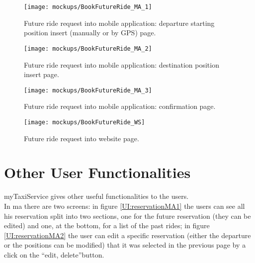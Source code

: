 \documentclass[\mainpath/main]{subfiles}
\begin{document}
\begin{figure}[ht!]
	\centering
	\begin{minipage}[t]{0.4\textwidth}
		\centering
		\texttt{[image: mockups/BookFutureRide\_MA\_1]}
		\caption[Future ride request part1 into mobile application.]{Future ride request into mobile application: departure starting position insert (manually or by GPS) page.}
		\label{UI:futuretimeMA1}
	\end{minipage}
	\hspace{1 cm}
	\begin{minipage}[t]{0.40\linewidth}
		\centering
		\texttt{[image: mockups/BookFutureRide\_MA\_2]}
		\caption[Future ride request part2 into mobile application.]{Future ride request into mobile application: destination position insert page.}
		\label{UI:futuretimeMA2}
	\end{minipage}
\end{figure}

\begin{figure}[ht!]
	\centering
	\begin{minipage}[t]{0.4\textwidth}
		\centering
		\texttt{[image: mockups/BookFutureRide\_MA\_3]}
		\caption[Future ride request part3 into mobile application.]{Future ride request into mobile application: confirmation page.}
		\label{UI:futuretimeMA3}
	\end{minipage}
	\hspace{1 cm}
	\begin{minipage}[t]{0.40\linewidth}
		\centering
		\texttt{[image: mockups/BookFutureRide\_WS]}
		\caption[Future ride request into website.]{Future ride request into website page.}
		\label{UI:futuretimeWS}
	\end{minipage}
\end{figure}

\section{Other User Functionalities}
\label{UI:OtherUserFunctionalities}
myTaxiService gives other useful functionalities to the users.\\
In \gls{ma} there are two screens: in figure \ref{UI:reservationMA1} the users can see all his reservation split into two sections, one for the future reservation (they can be edited) and one, at the bottom, for a list of the past rides; in figure \ref{UI:reservationMA2} the user can edit a specific reservation (either the departure or the positions can be modified) that it was selected in the previous page by a click on the \textquotedblleft edit, delete\textquotedblright  button.\\
\end{document}
